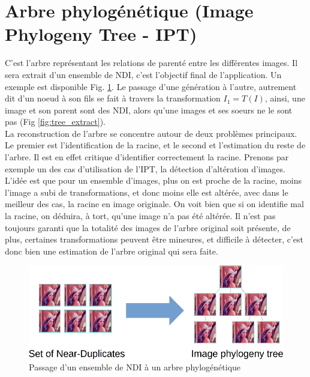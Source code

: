 \documentclass[utf8]{stageM2R} %
\begin{document}
\section{Arbre phylogénétique (Image Phylogeny Tree - IPT)}
C'est l'arbre représentant les relations de parenté entre les différentes images. Il sera extrait d'un ensemble de NDI, c'est l'objectif final de l'application. Un exemple est disponible Fig. \ref{fig:set_to_tree}. Le passage d'une génération à l'autre, autrement dit d'un noeud à son fils se fait à travers la transformation $I_{1} = T(I)$, ainsi, une image et son parent sont des NDI, alors qu'une images et ses soeurs ne le sont pas (Fig \ref{fig:tree_extract}).
\\ \indent
La reconstruction de l'arbre se concentre autour de deux problèmes principaux. Le premier est l'identification de la racine, et le second et l'estimation du reste de l'arbre. Il est en effet critique d'identifier correctement la racine. Prenons par exemple un des cas d'utilisation de l'IPT, la détection d'altération d'images. L'idée est que pour un ensemble d'images, plus on est proche de la racine, moins l'image a subi de transformations, et donc moins elle est altérée, avec dans le meilleur des cas, la racine en image originale. On voit bien que si on identifie mal la racine, on déduira, à tort, qu'une image n'a pas été altérée. Il n'est pas toujours garanti que la totalité des images de l'arbre original soit présente, de plus, certaines transformations peuvent être mineures, et difficile à détecter, c'est donc bien une estimation de l'arbre original qui sera faite.

\begin{figure}
  \begin{center}
    \includegraphics[width=120mm]{images/set_to_tree}
    \caption{Passage d'un ensemble de NDI à un arbre phylogénétique}
    \label{fig:set_to_tree}
  \end{center}
\end{figure}
\end{document}
